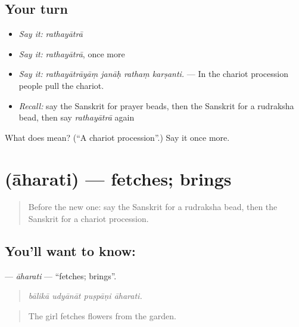 \subsection*{Your turn}
\begin{itemize}
\raggedright
  \item \emph{Say it:} \emph{rathayātrā}
  \item \emph{Say it:} \emph{rathayātrā}, once more
  \item \emph{Say it:} \emph{rathayātrāyāṃ janāḥ rathaṃ karṣanti.} — In the chariot procession people pull the chariot.
  \item \emph{Recall:} say the Sanskrit for prayer beads, then the Sanskrit for a rudraksha bead, then say \emph{rathayātrā} again
\end{itemize}

\begin{tcolorbox}[breakable,colback=teal!4,colframe=teal!35!black,title={Before you move on}]
What does  mean? (\textquotedblleft{}A chariot procession\textquotedblright{}.) Say it once more.
\end{tcolorbox}
\section[\texorpdfstring{\sk{आहरति} (āharati)}{आहरति (āharati)}]{ (āharati) — fetches; brings}

\label{lesson:SA-C400-aharati}



\begin{quote}
Before the new one: say the Sanskrit for a rudraksha bead, then the Sanskrit for a chariot procession.
\end{quote}

\subsection*{You'll want to know: }
\textbf{} — \emph{āharati} — \textquotedblleft{}fetches; brings\textquotedblright{}.

\begin{quote}
   
\end{quote}

\begin{quote}
\emph{bālikā udyānāt puṣpāṇi āharati.}
\end{quote}

\begin{quote}
The girl fetches flowers from the garden.
\end{quote}


